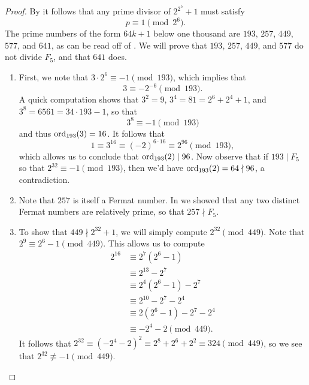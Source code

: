 \begin{proof}
  By  it follows that any prime divisor of $2^{2^5}+1$ must satisfy
  \begin{equation*}
    p\equiv 1\pmod{2^6}.
  \end{equation*}
  The prime numbers of the form $64k+1$ below one thousand are $193$, $257$, $449$, $577$, and $641$, as can be read off of . We will prove that $193$, $257$, $449$, and $577$ do not divide $F_5$, and that $641$ does.
  \begin{enumerate}
  \item First, we note that $3\cdot 2^6\equiv -1\pmod{193}$, which implies that
    \begin{equation*}
      3\equiv -2^{-6}\pmod{193}.
    \end{equation*}
    A quick computation shows that $3^2=9$, $3^4=81=2^6+2^4+1$, and $3^8=6561=34\cdot 193-1$, so that
    \begin{equation*}
      3^8\equiv -1\pmod{193}
    \end{equation*}
    and thus $\operatorname{ord}_{193}(3)=16$. It follows that
    \begin{equation*}
      1\equiv 3^{16}\equiv (-2)^{6\cdot 16}\equiv 2^{96}\pmod{193},
    \end{equation*}
    which allows us to conclude that $\operatorname{ord}_{193}(2)\mid 96$. Now observe that if $193\mid F_5$ so that $2^{32}\equiv -1\pmod{193}$, then we'd have $\operatorname{ord}_{193}(2)=64\nmid 96$, a contradiction.
  \item Note that $257$ is itself a Fermat number. In  we showed that any two distinct Fermat numbers are relatively prime, so that $257\nmid F_5$.
  \item To show that $449\nmid 2^{32}+1$, we will simply compute $2^{32}\pmod{449}$. Note that $2^9\equiv 2^6-1\pmod{449}$. This allows us to compute
    \begin{align*}
      2^{16}
      & \equiv 2^7(2^6-1) \\
      & \equiv 2^{13}-2^7 \\
      & \equiv 2^4(2^6-1)-2^7 \\
      & \equiv 2^{10}-2^7-2^4 \\
      & \equiv 2(2^6-1)-2^7-2^4 \\
      & \equiv -2^4-2\pmod{449}.
    \end{align*}
    It follows that $2^{32}\equiv (-2^4-2)^2\equiv 2^8+2^6+2^2\equiv 324\pmod{449}$, so we see that $2^{32}\nequiv-1\pmod{449}$.

\end{enumerate}
\end{proof}
